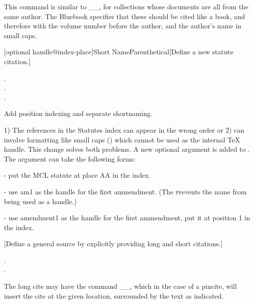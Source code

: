  \noindent This command is similar to _\newincollection_, for collections whose documents are all from the same author. The Bluebook specifies that these should
 be cited like a book, and therefore with the volume number before the author, and the author's name in small caps.


[optional handle@index-place]{Short Name}{Parenthetical}[Define a new statute citation.]
 \begin{Example}
   . \\
   . \\
   .
 \end{Example}


 Add position indexing and separate shortnaming.

1) The references in the Statutes index can appear in the wrong order or
 2) can involve formatting like small caps (\textsc) which cannot be used as
 the internal TeX handle. This change solves both problems. A new
 optional argument is added to \newstatute. The argument can take the
 following forms:

  - put the MCL statute at place AA in the index.

  - use am1 as the handle
 for the first ammendment. (The \textsc prevents the name from being used
 as a handle.)

  - use amendment1 as the
 handle for the first ammendment, put it at position 1 in the index.

[Define a general source by explicitly providing long and short citations.]
 \begin{Example}
   
   . \\
   .
 \end{Example}

 \noindent The long cite may have the command _\Pin_, which in the case of 
 a pincite, will insert the cite at the given location, surrounded by the text as indicated.
